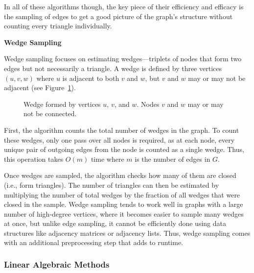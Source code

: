 \documentclass[11pt]{article}
\newcommand{\subsubsubsection}[1]{
  \vspace{1em} %
  \noindent\textbf{#1} %
  \vspace{0.5em} %
}
\begin{document}
In all of these algorithms though, the key piece of their efficiency and efficacy is the sampling of edges to get a good picture of the graph's structure without counting every triangle individually.

\subsubsubsection{Wedge Sampling}

Wedge sampling \cite{seshadhri_triadic_2013} focuses on estimating wedges—triplets of nodes that form two edges but not necessarily a triangle.
A wedge is defined by three vertices $(u, v, w)$ where $u$ is adjacent to both $v$ and $w$, but $v$ and $w$ may or may not be adjacent (see Figure~\ref{fig:wedge_diagram}).

\begin{figure}[h]
    \centering
    \caption{Wedge formed by vertices $u$, $v$, and $w$. Nodes $v$ and $w$ may or may not be connected.}
    \label{fig:wedge_diagram}
\end{figure}

First, the algorithm counts the total number of wedges in the graph.
To count these wedges, only one pass over all nodes is required, as at each node, every unique pair of outgoing edges from the node is counted as a single wedge.
Thus, this operation takes $O(m)$ time where $m$ is the number of edges in $G$.

Once wedges are sampled, the algorithm checks how many of them are closed (i.e., form triangles).
The number of triangles can then be estimated by multiplying the number of total wedges by the fraction of all wedges that were closed in the sample.
Wedge sampling tends to work well in graphs with a large number of high-degree vertices, where it becomes easier to sample many wedges at once, but unlike edge sampling, it cannot be efficiently done using data structures like adjacency matrices or adjacency lists.
Thus, wedge sampling comes with an additional preprocessing step that adds to runtime.

\subsubsection{Linear Algebraic Methods}
\end{document}
